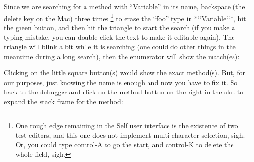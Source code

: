 \documentclass[letterpaper,10pt,english]{sphinxmanual}
\begin{document}
Since we are searching for a method with “Variable” in its name, backspace (the delete key on the
Mac) three times \footnote{
One rough edge remaining in the Self user interface is the existence of two test editors, and this one does not implement multi-character selection, sigh. Or, you could type control-A to go the start, and control-K to delete the whole field, sigh.
} to erase the “foo” type in *{}`{}`Variable{}`{}`*, hit the green button, and then hit the
triangle to start the search (if you make a typing mistake, you can double click the text to make it
editable again). The triangle will blink a bit while it is searching (one could do other things in the
meantime during a long search), then the enumerator will show the match(es):
\begin{figure}[htbp]\begin{flushleft}

\end{flushleft}\end{figure}

Clicking on the little square button(s) would show the exact method(s). But, for our purposes, just
knowing the name is enough and now you have to fix it. So back to the debugger and click on the
method button on the right in the  slot to expand the stack frame for the  method:
\begin{figure}[htbp]\begin{flushleft}

\end{flushleft}\end{figure}
\end{document}
